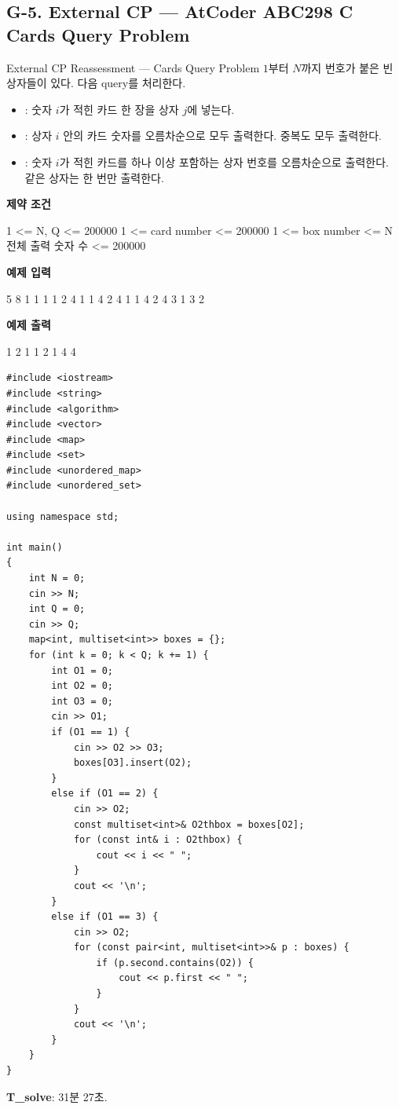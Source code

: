 \subsection{G-5. External CP --- AtCoder ABC298 C Cards Query Problem}
\begin{problembox}{External CP Reassessment --- Cards Query Problem}
$1$부터 $N$까지 번호가 붙은 빈 상자들이 있다. 다음 query를 처리한다.
\begin{itemize}
\item {}: 숫자 $i$가 적힌 카드 한 장을 상자 $j$에 넣는다.
\item {}: 상자 $i$ 안의 카드 숫자를 오름차순으로 모두 출력한다. 중복도 모두 출력한다.
\item {}: 숫자 $i$가 적힌 카드를 하나 이상 포함하는 상자 번호를 오름차순으로 출력한다. 같은 상자는 한 번만 출력한다.
\end{itemize}

\textbf{제약 조건}
\begin{TextBlock}
1 <= N, Q <= 200000
1 <= card number <= 200000
1 <= box number <= N
전체 출력 숫자 수 <= 200000
\end{TextBlock}

\textbf{예제 입력}
\begin{TextBlock}
5
8
1 1 1
1 2 4
1 1 4
2 4
1 1 4
2 4
3 1
3 2
\end{TextBlock}

\textbf{예제 출력}
\begin{TextBlock}
1 2
1 1 2
1 4
4
\end{TextBlock}
\end{problembox}

\begin{answerbox}[학습자 제출 답안]
\begin{lstlisting}
#include <iostream>
#include <string>
#include <algorithm>
#include <vector>
#include <map>
#include <set>
#include <unordered_map>
#include <unordered_set>

using namespace std;

int main()
{
    int N = 0;
    cin >> N;
    int Q = 0;
    cin >> Q;
    map<int, multiset<int>> boxes = {};
    for (int k = 0; k < Q; k += 1) {
        int O1 = 0;
        int O2 = 0;
        int O3 = 0;
        cin >> O1;
        if (O1 == 1) {
            cin >> O2 >> O3;
            boxes[O3].insert(O2);
        }
        else if (O1 == 2) {
            cin >> O2;
            const multiset<int>& O2thbox = boxes[O2];
            for (const int& i : O2thbox) {
                cout << i << " ";
            }
            cout << '\n';
        }
        else if (O1 == 3) {
            cin >> O2;
            for (const pair<int, multiset<int>>& p : boxes) {
                if (p.second.contains(O2)) {
                    cout << p.first << " ";
                }
            }
            cout << '\n';
        }
    }
}
\end{lstlisting}

\textbf{T\_solve}: 31분 27초.
\end{answerbox}

